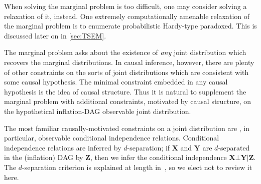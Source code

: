 When solving the marginal problem is too difficult, one may consider solving a relaxation of it, instead. One extremely computationally amenable relaxation of the marginal problem is to enumerate probabilistic Hardy-type paradoxed. This is discussed later on in  \cref{sec:TSEM}.




The marginal problem asks about the existence of \emph{any} joint distribution which recovers the marginal distributions. In causal inference, however, there are plenty of other constraints on the sorts of joint distributions which are consistent with some causal hypothesis. The minimal constraint embedded in any causal hypothesis is the idea of causal structure. Thus it is natural to supplement the marginal problem with additional constraints, motivated by causal structure, on the hypothetical inflation-DAG observable joint distribution.

The most familiar causally-motivated constraints on a joint distribution are , in particular, observable conditional independence relations.  Conditional independence relations are inferred by $d$-separation; if $\bm{X}$ and $\bm{Y}$ are $d$-separated in the (inflation) DAG by $\bm{Z}$, then we infer the conditional independence $\bm{X}\bot\bm{Y}|\bm{Z}$. The $d$-separation criterion is explained at length in~\cite{pearl2009causality,studeny2005probabilistic,WoodSpekkens,pusey2014gdag}, so we elect not to review it here.

